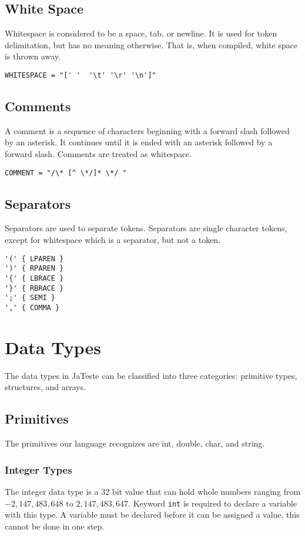 \documentclass{article}
\begin{document}
\subsection{White Space}
Whitespace is considered to be a space, tab, or newline. It is used for token delimitation, but has no meaning otherwise. That is, when compiled, white space is thrown away.

\begin{Verbatim}[frame=single]
WHITESPACE = "[' '  '\t' '\r' '\n']"
\end{Verbatim}

\subsection{Comments}
A comment is a sequence of characters beginning with a forward slash followed by an asterisk. It continues until it is ended with an asterisk followed by a forward slash. Comments are treated as whitespace. 
\begin{Verbatim}[frame=single]
COMMENT = "/\* [^ \*/]* \*/ "
\end{Verbatim}

\subsection{Separators}
Separators are used to separate tokens. Separators are single character tokens, except for whitespace which is a separator, but not a token. 
\begin{Verbatim}[frame=single]
'('	{ LPAREN }
')'	{ RPAREN }
'{'	{ LBRACE }
'}'	{ RBRACE }
';'	{ SEMI }
','	{ COMMA }
\end{Verbatim}

\section{Data Types}
The data types in JaTeste can be classified into three categories: primitive types, structures, and arrays. 

\subsection{Primitives}
The primitives our language recognizes are int, double, char, and string. 

\subsubsection{Integer Types}
The integer data type is a 32 bit value that can hold whole numbers ranging from $-2,147,483,648 \text{ to } 2,147,483,647$. Keyword \texttt{int} is required to declare a variable with this type.  A variable must be declared before it can be assigned a value, this cannot be done in one step.
\end{document}

